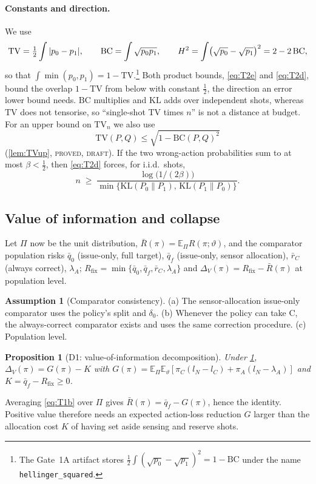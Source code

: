 \documentclass[10pt,twocolumn]{article}
\newtheorem{proposition}[theorem]{Proposition}
\theoremstyle{definition}
\newtheorem{assumption}{Assumption}
\theoremstyle{remark}
\newcommand{\E}{\mathbb{E}}
\newcommand{\vt}{\vartheta}
\newcommand{\lA}{\lambda_A}
\newcommand{\TV}{\mathrm{TV}}
\newcommand{\KL}{\mathrm{KL}}
\newcommand{\BC}{\mathrm{BC}}
\newcommand{\DV}{\Delta_V}
\begin{document}
\paragraph{Constants and direction.} We use
\begin{gather*}
\TV=\tfrac12\int|p_0-p_1|,\dsep
\BC=\int\sqrt{p_0p_1},\dsep
H^2=\int\bigl(\sqrt{p_0}-\sqrt{p_1}\bigr)^2=2-2\,\BC,
\end{gather*}
so that $\int\min(p_0,p_1)=1-\TV$.\footnote{The Gate~1A artifact stores $\tfrac12\int(\sqrt{p_0}-\sqrt{p_1})^2=1-\BC$ under the name \texttt{hellinger\_squared}.} Both product bounds, \eqref{eq:T2e} and \eqref{eq:T2d}, bound the overlap $1-\TV$ from below with constant $\tfrac12$, the direction an error lower bound needs. $\BC$ multiplies and $\KL$ adds over independent shots, whereas $\TV$ does not tensorise, so ``single-shot TV times $n$'' is not a distance at budget. For an upper bound on $\TV_n$ we also use
\begin{equation}\label{eq:TVup}
\TV(P,Q)\le\sqrt{1-\BC(P,Q)^2}
\end{equation}
(\cref{lem:TVup}, \textsc{proved, draft}). If the two wrong-action probabilities sum to at most $\beta<\tfrac12$, then \eqref{eq:T2d} forces, for i.i.d.\ shots,
\[
n\;\ge\;\frac{\log\bigl(1/(2\beta)\bigr)}{\min\{\KL(P_0\|P_1),\,\KL(P_1\|P_0)\}}.
\]

\subsection{Value of information and collapse}

Let $\Pi$ now be the unit distribution, $\bar R(\pi)=\E_\Pi R(\pi;\vt)$, and the comparator population risks $\bar q_0$ (issue-only, full target), $\bar q_f$ (issue-only, sensor allocation), $\bar r_C$ (always correct), $\lA$; $R_{\mathrm{fix}}=\min\{\bar q_0,\bar q_f,\bar r_C,\lA\}$ and $\DV(\pi)=R_{\mathrm{fix}}-\bar R(\pi)$ at population level.

\begin{assumption}[Comparator consistency]\label{ass:comp}
(a) The sensor-allocation issue-only comparator uses the policy's split and $\delta_0$. (b) Whenever the policy can take C, the always-correct comparator exists and uses the same correction procedure. (c) Population level.
\end{assumption}

\begin{proposition}[D1: value-of-information decomposition]\label{prop:D1}
Under \cref{ass:comp}, $\DV(\pi)=G(\pi)-K$ with $G(\pi)=\E_\Pi\E_\vt[\pi_C(l_N-l_C)+\pi_A(l_N-\lA)]$ and $K=\bar q_f-R_{\mathrm{fix}}\ge0$.
\end{proposition}
Averaging \eqref{eq:T1b} over $\Pi$ gives $\bar R(\pi)=\bar q_f-G(\pi)$, hence the identity. Positive value therefore needs an expected action-loss reduction $G$ larger than the allocation cost $K$ of having set aside sensing and reserve shots.
\end{document}
